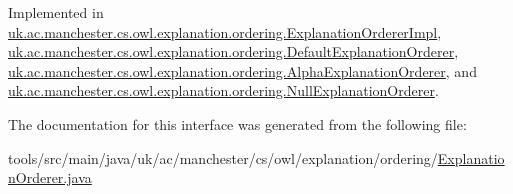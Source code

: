 Implemented in \hyperlink{classuk_1_1ac_1_1manchester_1_1cs_1_1owl_1_1explanation_1_1ordering_1_1_explanation_orderer_impl_a4d7b8ad9c2b34faac784bbb8f819736a}{uk.\-ac.\-manchester.\-cs.\-owl.\-explanation.\-ordering.\-Explanation\-Orderer\-Impl}, \hyperlink{classuk_1_1ac_1_1manchester_1_1cs_1_1owl_1_1explanation_1_1ordering_1_1_default_explanation_orderer_a636cbe4f299bc58056a9436653c851f8}{uk.\-ac.\-manchester.\-cs.\-owl.\-explanation.\-ordering.\-Default\-Explanation\-Orderer}, \hyperlink{classuk_1_1ac_1_1manchester_1_1cs_1_1owl_1_1explanation_1_1ordering_1_1_alpha_explanation_orderer_aee164af7587ab5ef0461f9df560e88d9}{uk.\-ac.\-manchester.\-cs.\-owl.\-explanation.\-ordering.\-Alpha\-Explanation\-Orderer}, and \hyperlink{classuk_1_1ac_1_1manchester_1_1cs_1_1owl_1_1explanation_1_1ordering_1_1_null_explanation_orderer_af193cd8fc05bd5247456b15ac1b92459}{uk.\-ac.\-manchester.\-cs.\-owl.\-explanation.\-ordering.\-Null\-Explanation\-Orderer}.



The documentation for this interface was generated from the following file\-:\begin{DoxyCompactItemize}
\item 
tools/src/main/java/uk/ac/manchester/cs/owl/explanation/ordering/\hyperlink{_explanation_orderer_8java}{Explanation\-Orderer.\-java}\end{DoxyCompactItemize}
